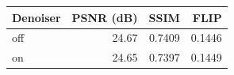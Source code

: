 \begin{tabular}{@{}lrrr@{}}
\toprule
Denoiser & PSNR (dB) & SSIM & FLIP \\
\midrule
off & 24.67 & 0.7409 & 0.1446 \\
on & 24.65 & 0.7397 & 0.1449 \\
\bottomrule
\end{tabular}
